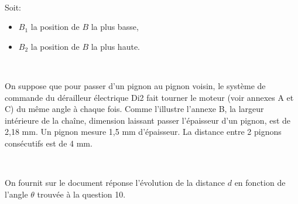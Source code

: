 ~\

Soit:\\
\begin{itemize}
 \item $B_1$ la position de $B$ la plus basse,
 \item $B_2$ la position de $B$ la plus haute.
\end{itemize}




%

~\

On suppose que pour passer d'un pignon au pignon voisin, le système de commande du dérailleur électrique Di2 fait tourner le moteur (voir annexes A et C) du même angle à chaque fois. Comme l'illustre l'annexe B, la largeur intérieure de la chaîne, dimension laissant passer l'épaisseur d'un pignon, est de 2,18 mm. Un pignon mesure 1,5 mm d'épaisseur. La distance entre 2 pignons consécutifs est de 4 mm. 


~\

On fournit sur le document réponse l'évolution de la distance $d$ en fonction de l'angle $\theta$ trouvée à la question 10.


